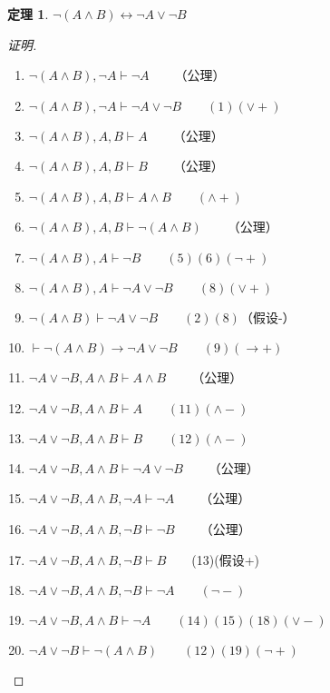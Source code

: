 \documentclass{article}
\newtheorem{Thm}{定理}
\begin{document}
\begin{CJK*}{UTF8}{gbsn}
  \begin{Thm}$\lnot (A\land B)\leftrightarrow \lnot A \lor \lnot B$\end{Thm}
  \begin{proof}[证明]$\quad$
    \begin{enumerate}
      \item $ \lnot (A\land B), \lnot A \vdash \lnot A\qquad$（公理） 
      \item $ \lnot (A\land B), \lnot A \vdash \lnot A\lor \lnot B\qquad(1)(\lor +)$
      \item $ \lnot (A\land B), A, B \vdash A\qquad$（公理）
      \item $ \lnot (A\land B), A, B \vdash B\qquad$（公理）
      \item $ \lnot (A\land B), A, B \vdash A\land B\qquad(\land +)$
      \item $ \lnot (A\land B), A, B \vdash \lnot(A\land B)\qquad$（公理）
      \item $ \lnot (A\land B), A \vdash \lnot B\qquad(5)(6)(\lnot +)$ 
      \item $ \lnot (A\land B), A \vdash \lnot A\lor \lnot B\qquad(8)(\lor +)$
      \item $ \lnot (A\land B) \vdash \lnot A\lor \lnot B\qquad(2)(8)$（假设-）
      \item $ \vdash\lnot (A\land B) \to \lnot A\lor \lnot B\qquad(9)(\to +)$
      \item $ \lnot A \lor \lnot B, A\land B \vdash A\land B\qquad$（公理）
      \item $ \lnot A \lor \lnot B, A\land B \vdash A\qquad (11) (\land -)$
      \item $ \lnot A \lor \lnot B, A\land B \vdash B\qquad (12) (\land -)$
      \item $ \lnot A \lor \lnot B, A\land B \vdash \lnot A \lor \lnot B\qquad $（公理）
      \item $ \lnot A \lor \lnot B, A\land B, \lnot A \vdash \lnot A\qquad$（公理）
      \item $ \lnot A \lor \lnot B, A\land B, \lnot B \vdash \lnot B\qquad$（公理）
      \item $ \lnot A \lor \lnot B, A\land B, \lnot B \vdash  B\qquad$(13)(假设+)
      \item $ \lnot A \lor \lnot B, A\land B, \lnot B \vdash \lnot A\qquad(\lnot -)$
      \item $ \lnot A \lor \lnot B, A\land B \vdash \lnot A\qquad (14)(15)(18)(\lor -)$ 
      \item $ \lnot A \lor \lnot B \vdash  \lnot(A\land B)\qquad(12)(19)(\lnot +)$

\end{enumerate}
\end{proof}
\end{CJK*}
\end{document}
